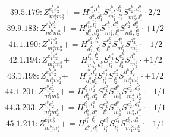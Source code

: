 \documentclass[letterpaper,10pt,fleqn,leqno,onecolumn]{article}
\begin{document}
\begin{equation} \;\;\;\;\;\;  39.5.179: Z^{e_{1}^{b}e_{2}^{b}}_{m_{1}^{b}m_{2}^{b}}+=H^{l_{1}^{a},l_{1}^{b}}_{d_{1}^{a},d_{1}^{b}}S^{e_{1}^{b},d_{1}^{a}}_{m_{1}^{b},l_{1}^{a}}S^{e_{2}^{b},d_{1}^{b}}_{m_{2}^{b},l_{1}^{b}}\cdot 2/2 \end{equation}
\begin{equation} \;\;\;\;\;\;  39.9.183: Z^{e_{1}^{b}e_{2}^{b}}_{m_{1}^{b}m_{2}^{b}}+=H^{l_{1}^{a},l_{2}^{a}}_{d_{1}^{a},d_{2}^{a}}S^{e_{1}^{b},d_{1}^{a}}_{m_{1}^{b},l_{1}^{a}}S^{e_{2}^{b},d_{2}^{a}}_{m_{2}^{b},l_{2}^{a}}\cdot +1/2 \end{equation}
\begin{equation} \;\;\;\;\;\;  41.1.190: Z^{e_{1}^{b}e_{2}^{b}}_{m_{1}^{b}m_{2}^{b}}+=H^{e_{1}^{b},l_{1}^{b}}_{d_{1}^{b},d_{2}^{b}}S^{e_{2}^{b}}_{l_{1}^{b}}S^{d_{1}^{b}}_{m_{1}^{b}}S^{d_{2}^{b}}_{m_{2}^{b}}\cdot -1/2 \end{equation}
\begin{equation} \;\;\;\;\;\;  42.1.194: Z^{e_{1}^{b}e_{2}^{b}}_{m_{1}^{b}m_{2}^{b}}+=H^{l_{1}^{b},l_{2}^{b}}_{m_{1}^{b},d_{1}^{b}}S^{e_{1}^{b}}_{l_{1}^{b}}S^{e_{2}^{b}}_{l_{2}^{b}}S^{d_{1}^{b}}_{m_{2}^{b}}\cdot +1/2 \end{equation}
\begin{equation} \;\;\;\;\;\;  43.1.198: Z^{e_{1}^{b}e_{2}^{b}}_{m_{1}^{b}m_{2}^{b}}+=H^{l_{1}^{b},l_{2}^{b}}_{d_{1}^{b}d_{2}^{b}}S^{e_{1}^{b}}_{l_{1}^{b}}S^{e_{2}^{b}}_{l_{2}^{b}}S^{d_{1}^{b}d_{2}^{b}}_{m_{1}^{b}m_{2}^{b}}\cdot +1/2 \end{equation}
\begin{equation} \;\;\;\;\;\;  44.1.201: Z^{e_{1}^{b}e_{2}^{b}}_{m_{1}^{b}m_{2}^{b}}+=H^{l_{1}^{b},l_{2}^{b}}_{d_{1}^{b},d_{2}^{b}}S^{e_{1}^{b}}_{l_{1}^{b}}S^{d_{1}^{b}}_{m_{1}^{b}}S^{e_{2}^{b},d_{2}^{b}}_{m_{2}^{b},l_{2}^{b}}\cdot -1/1 \end{equation}
\begin{equation} \;\;\;\;\;\;  44.3.203: Z^{e_{1}^{b}e_{2}^{b}}_{m_{1}^{b}m_{2}^{b}}+=H^{l_{1}^{b},l_{1}^{a}}_{d_{1}^{b},d_{1}^{a}}S^{e_{1}^{b}}_{l_{1}^{b}}S^{d_{1}^{b}}_{m_{1}^{b}}S^{e_{2}^{b},d_{1}^{a}}_{m_{2}^{b},l_{1}^{a}}\cdot -1/1 \end{equation}
\begin{equation} \;\;\;\;\;\;  45.1.211: Z^{e_{1}^{b}e_{2}^{b}}_{m_{1}^{b}m_{2}^{b}}+=H^{l_{1}^{b},l_{2}^{b}}_{d_{1}^{b},d_{2}^{b}}S^{e_{1}^{b}}_{l_{1}^{b}}S^{d_{1}^{b}}_{l_{2}^{b}}S^{e_{2}^{b},d_{2}^{b}}_{m_{1}^{b}m_{2}^{b}}\cdot -1/1 \end{equation}
\end{document}
